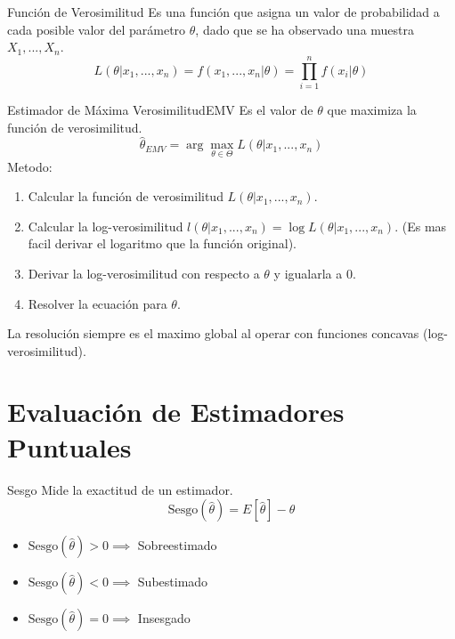 \documentclass[a4paper,11pt]{article}
\begin{document}
\begin{definicion}{Función de Verosimilitud}{}
    Es una función que asigna un valor de probabilidad a cada posible valor del parámetro $\theta$, dado que se ha observado una muestra $X_1, ..., X_n$.
    \begin{equation*}
        L(\theta | x_1, ..., x_n) = f(x_1, ..., x_n | \theta) = \prod_{i=1}^n f(x_i | \theta)
    \end{equation*}
\end{definicion}

\begin{definicion}{Estimador de Máxima Verosimilitud}{EMV}
    Es el valor de $\theta$ que maximiza la función de verosimilitud.
    \begin{equation*}
        \hat{\theta}_{EMV} = \arg\max_{\theta \in \Theta} L(\theta | x_1, ..., x_n)
    \end{equation*}
    Metodo:
    \begin{enumerate}
        \item Calcular la función de verosimilitud $L(\theta | x_1, ..., x_n)$.
        \item Calcular la log-verosimilitud $l(\theta | x_1, ..., x_n) = \log L(\theta | x_1, ..., x_n)$. (Es mas facil derivar el logaritmo que la función original).
        \item Derivar la log-verosimilitud con respecto a $\theta$ y igualarla a 0.
        \item Resolver la ecuación para $\theta$.
    \end{enumerate}
    \begin{nota}[]
        La resolución siempre es el maximo global al operar con funciones concavas (log-verosimilitud).
    \end{nota}
\end{definicion}

\newpage

\section{Evaluación de Estimadores Puntuales}

\begin{definicion}{Sesgo}{}
    Mide la exactitud de un estimador.
    \begin{equation*}
        \text{Sesgo}(\hat{\theta}) = E[\hat{\theta}] - \theta
    \end{equation*}
    \begin{itemize}
        \item $\text{Sesgo}(\hat{\theta}) > 0 \implies $ Sobreestimado
        \item $\text{Sesgo}(\hat{\theta}) < 0 \implies $ Subestimado
        \item $\text{Sesgo}(\hat{\theta}) = 0 \implies $ Insesgado
    \end{itemize}
\end{definicion}
\end{document}
